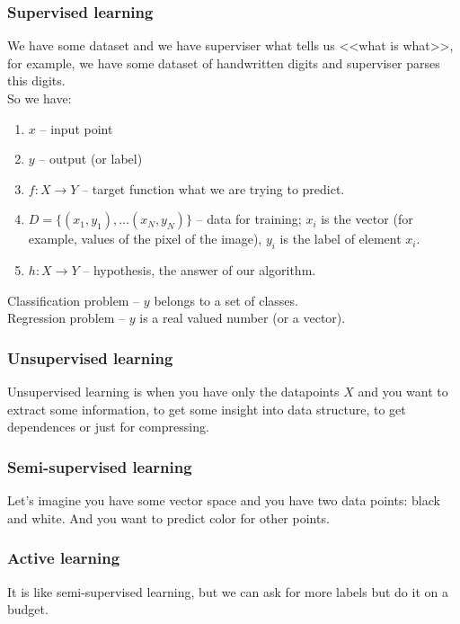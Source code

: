 \subsubsection*{Supervised learning}

We have some dataset and we have superviser what tells us <<what is what>>, for example, we have some dataset of handwritten digits and superviser parses this digits. \\
So we have:
\begin{enumerate}[label=$\bullet$]
	\item $x$ -- input point
	\item $y$ -- output (or label)
	\item $f\colon X\to Y$ -- target function what we are trying to predict.
	\item $D=\{(x_1,y_1),\ldots(x_N,y_N)\}$ -- data for training; $x_i$ is the vector (for example, values of the pixel of the image), $y_i$ is the label of element $x_i$.
	\item $h\colon X\to Y$ -- hypothesis, the answer of our algorithm.
\end{enumerate}
Classification problem -- $y$ belongs to a set of classes.\\
Regression problem -- $y$ is a real valued number (or a vector).

\subsubsection*{Unsupervised learning}

Unsupervised learning is when you have only the datapoints $X$ and you want to extract some information, to get some insight into data structure, to get dependences or just for compressing. 

\subsubsection*{Semi-supervised learning}

Let's imagine you have some vector space and you have two data points: black and white. And you want to predict color for other points.

\subsubsection*{Active learning}

It is like semi-supervised learning, but we can ask for more labels but do it on a budget.

